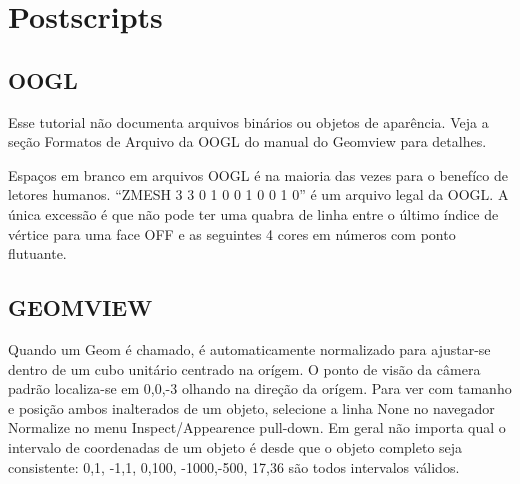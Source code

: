 \documentclass[12pt,a4paper]{book}
\begin{document}
\chapter{Postscripts}

\section{OOGL}

Esse tutorial n\~ao documenta arquivos bin\'arios ou objetos de apar\^encia.
Veja a se\c{c}\~ao Formatos de Arquivo da OOGL do manual do Geomview para detalhes. 

Espa\c{c}os em branco em arquivos OOGL \'e na maioria das vezes para o benef\'ico de letores humanos.
``ZMESH 3 3 0 1 0 0 1 0 0 1 0'' \'e um arquivo legal da OOGL.  A \'unica
excess\~ao \'e que n\~ao pode ter uma quabra de linha entre o \'ultimo \'indice de
v\'ertice para uma face OFF e as seguintes 4 cores em n\'umeros com ponto flutuante.

\section{GEOMVIEW}

Quando um Geom \'e chamado, \'e automaticamente normalizado para ajustar-se dentro de um
cubo unit\'ario centrado na or\'igem. O ponto de vis\~ao da c\^amera padr\~ao localiza-se em
{0,0,-3} olhando na dire\c{c}\~ao da or\'igem. Para ver com tamanho e posi\c{c}\~ao
ambos inalterados de um objeto, selecione a linha None no navegador Normalize
no menu Inspect/Appearence pull-down. Em geral n\~ao importa qual o intervalo de
coordenadas de um objeto \'e desde que o objeto completo seja consistente: {0,1},
{-1,1}, {0,100}, {-1000,-500}, {17,36} s\~ao todos intervalos v\'alidos.
\end{document}
